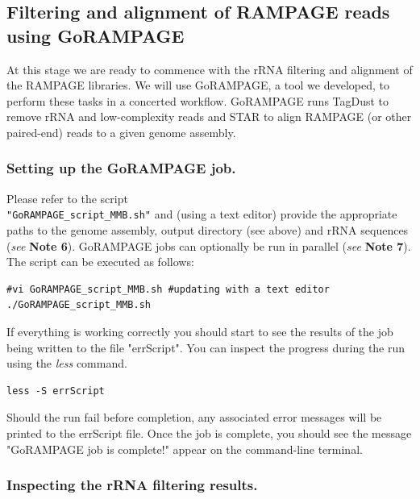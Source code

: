 \documentclass[runningheads,a4paper]{llncs}
\begin{document}
\begin{linenumbers}
\subsection{Filtering and alignment of RAMPAGE reads using GoRAMPAGE}
At this stage we are ready to commence with the rRNA filtering and alignment of the RAMPAGE libraries.
We will use GoRAMPAGE, a tool we developed, to perform these tasks in a concerted workflow. 
GoRAMPAGE runs TagDust \cite{Lassmann:2015gs} to remove rRNA and low-complexity reads and STAR \cite{Dobin:2016kq} to align RAMPAGE (or other paired-end) reads to a given genome assembly.

\subsubsection{Setting up the GoRAMPAGE job.}
Please refer to the script \\ \texttt{"GoRAMPAGE\_script\_MMB.sh"} and (using a text editor) provide the appropriate paths to the genome assembly, output directory (see above) and rRNA sequences (\textit{see} \textbf{Note 6}). 
GoRAMPAGE jobs can optionally be run in parallel (\textit{see} \textbf{Note 7}).
The script can be executed as follows:

\noindent
\begin{verbatim}
#vi GoRAMPAGE_script_MMB.sh #updating with a text editor
./GoRAMPAGE_script_MMB.sh
\end{verbatim}

\noindent
If everything is working correctly you should start to see the results of the job being written to the file "errScript".
You can inspect the progress during the run using the \textit{less} command. 

\noindent
\begin{verbatim}
less -S errScript
\end{verbatim}

\noindent
Should the run fail before completion, any associated error messages will be printed to the errScript file. Once the job is complete, you should see the message "GoRAMPAGE job is complete!" appear on the command-line terminal.

\subsubsection{Inspecting the rRNA filtering results.}


\end{linenumbers}
\end{document}
